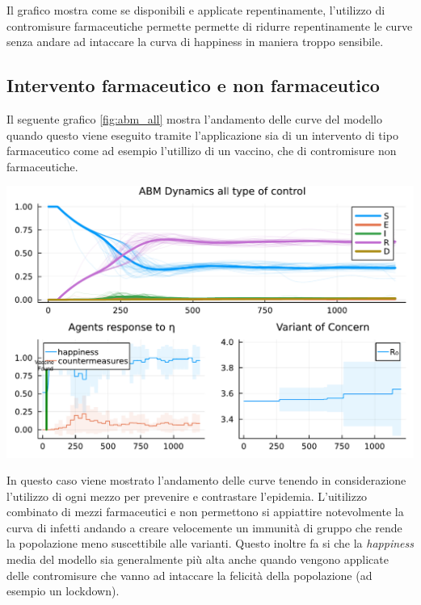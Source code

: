 Il grafico mostra come se disponibili e applicate repentinamente, l'utilizzo di contromisure farmaceutiche permette 
permette di ridurre repentinamente le curve senza andare ad intaccare la curva di happiness in maniera troppo sensibile.
\newpage

\subsection{Intervento farmaceutico e non farmaceutico}
Il seguente grafico \ref{fig:abm_all} mostra l'andamento delle curve del modello
quando questo viene eseguito tramite l'applicazione sia di un intervento di tipo farmaceutico 
come ad esempio l'utillizo di un vaccino, che di contromisure non farmaceutiche.

\begin{minipage}{\linewidth}
	\centering
	\includegraphics[width=\textwidth]{img/SocialNetworkABM_ALL.pdf}
	\label{fig:abm_all}
\end{minipage}

In questo caso viene mostrato l'andamento delle curve tenendo in considerazione l'utilizzo di ogni mezzo
per prevenire e contrastare l'epidemia. L'uitilizzo combinato di mezzi farmaceutici e non permettono 
si appiattire notevolmente la curva di infetti andando a creare velocemente un immunità di gruppo 
che rende la popolazione meno suscettibile alle varianti. Questo inoltre fa si che la \emph{happiness} media
del modello sia generalmente più alta anche quando vengono applicate delle contromisure che vanno ad 
intaccare la felicità della popolazione (ad esempio un lockdown). 

